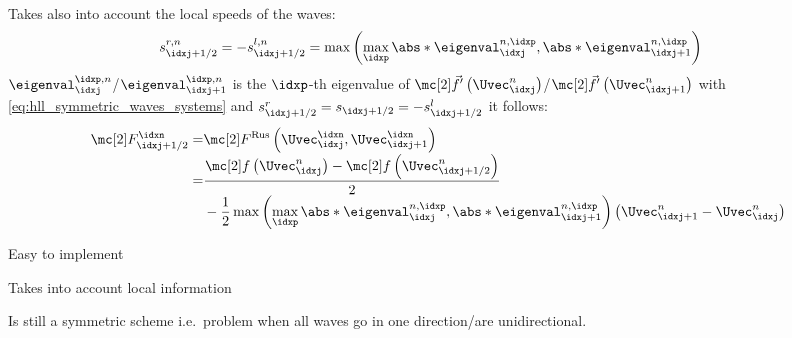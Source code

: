 \begin{defnbox}\nospacing
    \begin{defn}\label{defn:Rusanov_local_friedrichs_scheme_systems}\leavevmode\\
        Takes also into account the local speeds of the waves:
        \begin{align}
          s_{\idxj+1/2}^{r,n}=-s_{\idxj+1/2}^{l,n}=
          \max\left(\max_{\idxp}\abs*{\eigenval_{\idxj}^{n,\idxp}},\abs*{\eigenval_{\idxj+1}^{n,\idxp}}\right)&&
        \end{align}
        $\eigenval_{\idxj}^{\idxp,n}$/$\eigenval_{\idxj+1}^{\idxp,n}$ is the $\idxp$-th eigenvalue of $\fluxvec'\left(\Uvec_{\idxj}^{n}\right)$/$\fluxvec'\left(\Uvec_{\idxj+1}^{n}\right)$
        with \cref{eq:hll_symmetric_waves_systems} and $s_{\idxj+1/2}^{r}=s_{\idxj+1/2}=-s_{\idxj+1/2}^{l}$ it follows:
        \begin{align}
          \Flux_{\idxj+1/2}^{\idxn}=&\Flux^{\text{Rus}}\left(\Uvec^{\idxn}_{\idxj},\Uvec^{\idxn}_{\idxj+1}\right)\\[-1\jot]
                                   =&\frac{\flux\left(\Uvec_{\idxj}^{n}\right)-\flux \left(\Uvec_{\idxj+1/2}^{n}\right)}{2}\nonumber\\[-1\jot]
          &-\frac{1}{2}\max\left(\max_{\idxp}\abs*{\eigenval_{\idxj}^{n,\idxp}},\abs*{\eigenval_{\idxj+1}^{n,\idxp}}\right)\left(\Uvec_{\idxj+1}^{n}-\Uvec_{\idxj}^{n}\right)\nonumber
        \end{align}
    \end{defn}
\end{defnbox}
\begin{sectionbox}\nospacing
    \begin{minipage}[t]{0.4\textwidth}
       \begin{proslist}
           \item Easy to implement
           \item Takes into account local information
       \end{proslist}
    \end{minipage}
    \begin{minipage}[t]{0.55\textwidth}
       \begin{conslist}
           \item Is still a symmetric scheme i.e.\ problem when all waves go in one direction/are unidirectional.
       \end{conslist}
    \end{minipage}
\end{sectionbox}
